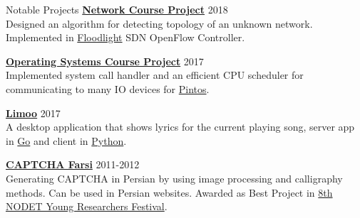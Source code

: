 \documentclass{resume} %
\begin{document}
\begin{rSection}{Notable Projects}
	{\bf \href{https://github.com/shayanh/floodlight-sara-protocol}{Network Course Project}} \hfill 2018
	\\Designed an algorithm for detecting topology of an unknown network. Implemented in \href{https://github.com/floodlight/floodlight}{Floodlight} SDN OpenFlow Controller.
	
	{\bf \href{https://github.com/shayanh/pintos}{Operating Systems Course Project}} \hfill 2017
	\\Implemented system call handler and an efficient CPU scheduler for communicating to many IO devices for \href{https://en.wikipedia.org/wiki/Pintos}{Pintos}.
	
	{\bf \href{https://github.com/shayanh/limoo}{Limoo}} \hfill 2017
	\\A desktop application that shows lyrics for the current playing song, server app in \href{https://github.com/shayanh/limoo-server}{Go} and client in \href{https://github.com/shayanh/limoo}{Python}.
	
	{\bf \href{https://github.com/KhassTeam/Persian-CAPTCHA}{CAPTCHA Farsi}} \hfill 2011-2012
	\\Generating CAPTCHA in Persian by using image processing and calligraphy methods. Can be used in Persian websites. Awarded as Best Project in
	\href{https://www.helli.ir/portal/content/%D8%AA%D9%82%D8%AF%DB%8C%D8%B1-%D8%A7%D8%B2-%D8%AF%D8%A7%D9%86%D8%B4-%D8%A2%D9%85%D9%88%D8%B2%D8%A7%D9%86-%D8%A8%D8%B1%D8%AA%D8%B1%D9%BE%DA%98%D9%88%D9%87%D8%B4%DA%AF%D8%B1}
		{8th NODET Young Researchers Festival}.
\end{rSection}
	
\end{document}
